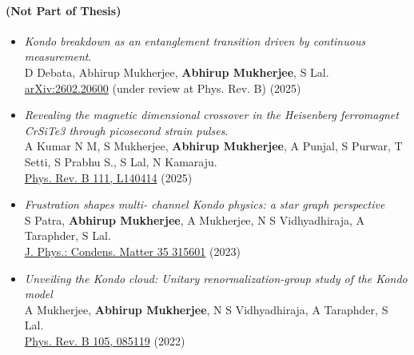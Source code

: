 \paragraph{(Not Part of Thesis)}
\begin{itemize}
	\item[4.] {\it Kondo breakdown as an entanglement transition driven by continuous measurement}.\\ D Debata, Abhirup Mukherjee, {\bf Abhirup Mukherjee}, S Lal.\\ \href{https://arxiv.org/abs/2602.20600}{arXiv:2602.20600} (under review at Phys. Rev. B) (2025)
	\item[5.] {\it Revealing the magnetic dimensional crossover in the Heisenberg ferromagnet CrSiTe3 through picosecond strain
		pulses}.\\ A Kumar N M, S Mukherjee, {\bf Abhirup Mukherjee}, A Punjal, S Purwar, T Setti, S Prabhu S., S Lal, N Kamaraju.\\ \href{https://link.aps.org/doi/10.1103/PhysRevB.111.L140414}{Phys. Rev. B 111, L140414} (2025)
	\item[6.] {\it Frustration shapes multi-
		channel Kondo physics: a star graph perspective}\\ S Patra, {\bf Abhirup Mukherjee}, A Mukherjee, N S Vidhyadhiraja, A Taraphder, S Lal.\\ \href{https://dx.doi.org/10.1088/1361-648X/acd09c}{J. Phys.: Condens. Matter 35 315601} (2023)
	\item[7.] {\it Unveiling the Kondo cloud:
		Unitary renormalization-group study of the Kondo model}\\ A Mukherjee, {\bf Abhirup Mukherjee}, N S Vidhyadhiraja, A Taraphder, S Lal.\\ \href{https://link.aps.org/doi/10.1103/PhysRevB.105.085119}{Phys. Rev. B 105, 085119} (2022)
\end{itemize}

